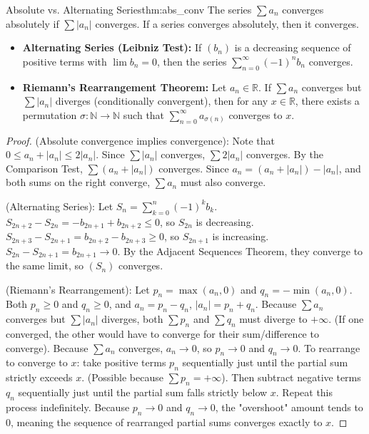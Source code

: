 \documentclass[11pt, a4paper]{article}
\begin{document}
\begin{theorem}{Absolute vs. Alternating Series}{thm:abs_conv}
The series $\sum a_n$ converges absolutely if $\sum |a_n|$ converges. If a series converges absolutely, then it converges.
\begin{itemize}
    \item \textbf{Alternating Series (Leibniz Test):} If $(b_n)$ is a decreasing sequence of positive terms with $\lim b_n = 0$, then the series $\sum_{n=0}^\infty (-1)^n b_n$ converges.
    \item \textbf{Riemann's Rearrangement Theorem:} Let $a_n \in \mathbb{R}$. If $\sum a_n$ converges but $\sum |a_n|$ diverges (conditionally convergent), then for any $x \in \mathbb{R}$, there exists a permutation $\sigma: \mathbb{N} \to \mathbb{N}$ such that $\sum_{n=0}^\infty a_{\sigma(n)}$ converges to $x$.
\end{itemize}
\end{theorem}
\begin{proof}
(Absolute convergence implies convergence): Note that $0 \le a_n + |a_n| \le 2|a_n|$. Since $\sum |a_n|$ converges, $\sum 2|a_n|$ converges. By the Comparison Test, $\sum (a_n + |a_n|)$ converges. 
Since $a_n = (a_n + |a_n|) - |a_n|$, and both sums on the right converge, $\sum a_n$ must also converge.

(Alternating Series): Let $S_n = \sum_{k=0}^n (-1)^k b_k$. $S_{2n+2} - S_{2n} = -b_{2n+1} + b_{2n+2} \le 0$, so $S_{2n}$ is decreasing. $S_{2n+3} - S_{2n+1} = b_{2n+2} - b_{2n+3} \ge 0$, so $S_{2n+1}$ is increasing. $S_{2n} - S_{2n+1} = b_{2n+1} \to 0$. By the Adjacent Sequences Theorem, they converge to the same limit, so $(S_n)$ converges.

(Riemann's Rearrangement): Let $p_n = \max(a_n, 0)$ and $q_n = -\min(a_n, 0)$. Both $p_n \ge 0$ and $q_n \ge 0$, and $a_n = p_n - q_n$, $|a_n| = p_n + q_n$.
Because $\sum a_n$ converges but $\sum |a_n|$ diverges, both $\sum p_n$ and $\sum q_n$ must diverge to $+\infty$. (If one converged, the other would have to converge for their sum/difference to converge). Because $\sum a_n$ converges, $a_n \to 0$, so $p_n \to 0$ and $q_n \to 0$.
To rearrange to converge to $x$: take positive terms $p_n$ sequentially just until the partial sum strictly exceeds $x$. (Possible because $\sum p_n = +\infty$). Then subtract negative terms $q_n$ sequentially just until the partial sum falls strictly below $x$. Repeat this process indefinitely. Because $p_n \to 0$ and $q_n \to 0$, the "overshoot" amount tends to 0, meaning the sequence of rearranged partial sums converges exactly to $x$.
\end{proof}
\end{document}
